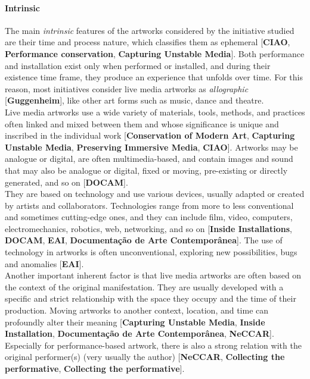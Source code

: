 \paragraph*{Intrinsic}
The main \textit{intrinsic} features of the artworks considered by the initiative studied are their time and process nature, which classifies them as ephemeral [\textbf{CIAO}, \textbf{Performance conservation}, \textbf{Capturing Unstable Media}]. Both performance and installation exist only when performed or installed, and during their existence time frame, they produce an experience that unfolds over time. For this reason, most initiatives consider live media artworks as \textit{allographic} [\textbf{Guggenheim}], like other art forms such as music, dance and theatre.\\
Live media artworks use a wide variety of materials, tools, methods, and practices often linked and mixed between them and whose significance is unique and inscribed in the individual work [\textbf{Conservation of Modern Art}, \textbf{Capturing Unstable Media}, \textbf{Preserving Immersive Media}, \textbf{CIAO}]. Artworks may be analogue or digital, are often multimedia-based, and contain images and sound that may also be analogue or digital, fixed or moving, pre-existing or directly generated, and so on [\textbf{DOCAM}].\\
They are based on technology and use various devices, usually adapted or created by artists and collaborators. Technologies range from more to less conventional and sometimes cutting-edge ones, and they can include film, video, computers, electromechanics, robotics, web, networking, and so on [\textbf{Inside Installations}, \textbf{DOCAM}, \textbf{EAI}, \textbf{Documentação de Arte Contemporânea}]. The use of technology in artworks is often unconventional, exploring new possibilities, bugs and anomalies [\textbf{EAI}].\\
Another important inherent factor is that live media artworks are often based on the context of the original manifestation. They are usually developed with a specific and strict relationship with the space they occupy and the time of their production. Moving artworks to another context, location, and time can profoundly alter their meaning [\textbf{Capturing Unstable Media}, \textbf{Inside Installation}, \textbf{Documentação de Arte Contemporânea}, \textbf{NeCCAR}]. Especially for performance-based artwork, there is also a strong relation with the original performer(s) (very usually the author) [\textbf{NeCCAR}, \textbf{Collecting the performative}, \textbf{Collecting the performative}].\\
